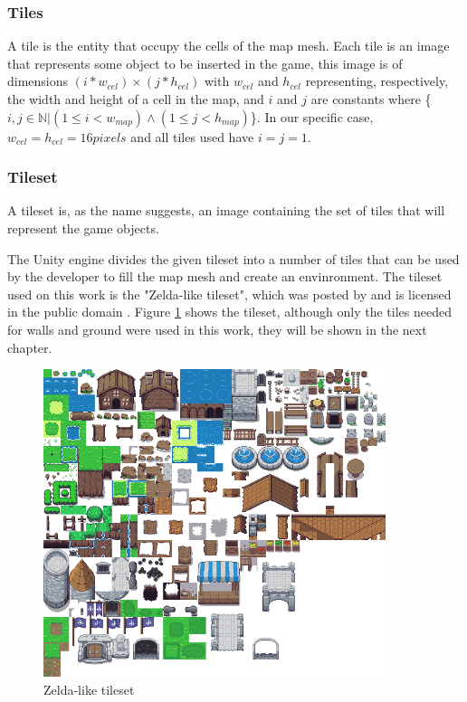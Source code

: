 \subsubsection{Tiles}

A tile is the entity that occupy the cells of the map mesh. Each tile is an image that represents some object to be inserted in the game, this image is of dimensions \((i*w_{cel})\times(j*h_{cel})\) with \(w_{cel}\) and \(h_{cel}\) representing, respectively, the width and height of a cell in the map, and \(i\) and \(j\) are constants where \{\(i, j \in \mathbb{N}|(1\leq i<w_{map})\wedge(1\leq j<h_{map})\)\}. In our specific case, \(w_{cel}=h_{cel}=16 {pixels}\) and all tiles used have \(i=j=1\). 
\subsubsection{Tileset}

A tileset is, as the name suggests, an image containing the set of tiles that will represent the game objects.

The Unity engine divides the given tileset into a number of tiles that can be used by the developer to fill the map mesh and create an envinronment. The tileset used on this work is the "Zelda-like tileset", which was posted by \citeauthor{arm:2017} and is licensed in the public domain \citeyear{arm:2017}. Figure \ref{fig:tileset} shows the tileset, although only the tiles needed for walls and ground were used in this work, they will be shown in the next chapter.

\begin{figure}[h]
    \caption{Zelda-like tileset}
    \centerline{\includegraphics[width=10cm]{images/proposal/overworld.png}}
    \label{fig:tileset}
\end{figure}

